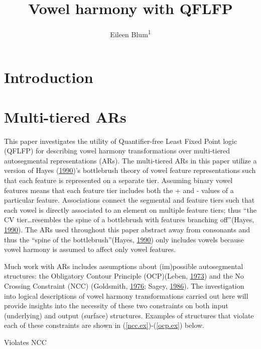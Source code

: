 \documentclass[,doc,floatsintext]{apa6}
\title{Vowel harmony with QFLFP}
\author{Eileen Blum\textsuperscript{1}}
\date{}
\affiliation{
\vspace{0.5cm}
\textsuperscript{1} Rutgers University}
\theoremstyle{definition}
\theoremstyle{definition}
\theoremstyle{definition}
\theoremstyle{remark}
\begin{document}
\maketitle

\section{Introduction}\label{introduction}

\section{Multi-tiered ARs}\label{multi-tiered-ars}

This paper investigates the utility of Quantifier-free Least Fixed Point
logic (QFLFP) for describing vowel harmony transformations over
multi-tiered autosegmental representations (ARs). The multi-tiered ARs
in this paper utilize a version of Hayes
(\protect\hyperlink{ref-hayes1990}{1990})'s bottlebrush theory of vowel
feature representations such that each feature is represented on a
separate tier. Assuming binary vowel features means that each feature
tier includes both the + and - values of a particular feature.
Associations connect the segmental and feature tiers such that each
vowel is directly associated to an element on multiple feature tiers;
thus \enquote{the CV tier\ldots{}resembles the spine of a bottlebrush
with features branching off}(Hayes,
\protect\hyperlink{ref-hayes1990}{1990}). The ARs used throughout this
paper abstract away from consonants and thus the \enquote{spine of the
bottlebrush}(Hayes, \protect\hyperlink{ref-hayes1990}{1990}) only
includes vowels because vowel harmony is assumed to affect only vowel
features.

Much work with ARs includes assumptions about (im)possible autosegmental
structures: the Obligatory Contour Principle (OCP)(Leben,
\protect\hyperlink{ref-leben1973}{1973}) and the No Crossing Constraint
(NCC) (Goldsmith, \protect\hyperlink{ref-Goldsmith1976}{1976}; Sagey,
\protect\hyperlink{ref-sagey1986}{1986}). The investigation into logical
descriptions of vowel harmony transformations carried out here will
provide insights into the necessity of these two constraints on both
input (underlying) and output (surface) structures. Examples of
structures that violate each of these constraints are shown in
(\ref{ncc.ex})-(\ref{ocp.ex}) below.

\begin{exe}
\ex \label{ncc.ex} Violates NCC
\end{exe}
\end{document}

